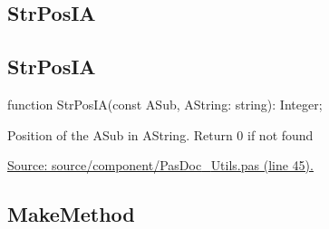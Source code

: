 \documentclass{report}
\newif\ifpdf
\begin{document}
\subsection*{\large{\textbf{StrPosIA}}\normalsize\hspace{1ex}\hrulefill}
\else
\subsection*{StrPosIA}
\fi
\label{PasDoc_Utils-StrPosIA}
\begin{list}{}{
\setlength{\itemindent}{0cm}
\setlength{\listparindent}{0cm}
\setlength{\leftmargin}{\evensidemargin}
\addtolength{\leftmargin}{\tmplength}
\settowidth{\labelsep}{X}
\addtolength{\leftmargin}{\labelsep}
\setlength{\labelwidth}{\tmplength}
}
\item[\textbf{Declaration}\hfill]
\ifpdf
\begin{flushleft}
\fi
\begin{ttfamily}
function StrPosIA(const ASub, AString: string): Integer;\end{ttfamily}

\ifpdf
\end{flushleft}
\fi

\par
\item[\textbf{Description}]
Position of the ASub in AString. Return 0 if not found\par
\href{https://github.com/pasdoc/pasdoc/blob/master/source/component/PasDoc_Utils.pas#L45}{Source: source/component/PasDoc{\_}Utils.pas (line 45).}

\end{list}
\ifpdf
\subsection*{\large{\textbf{MakeMethod}}\normalsize\hspace{1ex}\hrulefill}
\else
\end{document}
